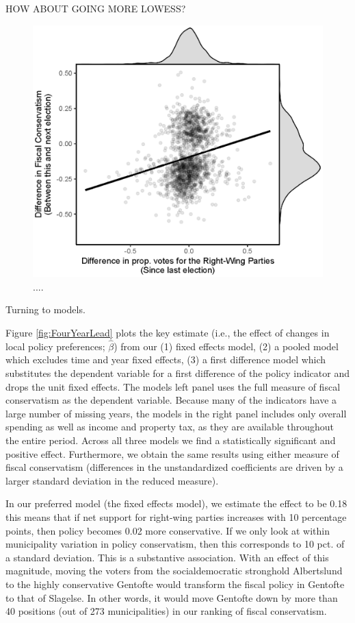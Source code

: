 \documentclass[a4paper,12pt]{article}
\begin{document}
HOW ABOUT GOING MORE LOWESS?

\begin{figure}[h]
	\centering
	\includegraphics[scale = 1.2]{fd_plot.eps}
	\caption{....}
	\label{fig:scatter}
\end{figure}

Turning to models. 

Figure \ref{fig:FourYearLead} plots the key estimate (i.e., the effect of changes in local policy preferences; $\hat{\beta}$) from our (1) fixed effects model, (2) a pooled model which excludes time and year fixed effects, (3) a first difference model which substitutes the dependent variable for a first difference of the policy indicator and drops the unit fixed effects. The models left panel uses the full measure of fiscal conservatism as the dependent variable. Because many of the indicators have a large number of missing years, the models in the right panel includes only overall spending as well as income and property tax, as they are available throughout the entire period. Across all three models we find a statistically significant and positive effect. Furthermore, we obtain the same results using either measure of fiscal conservatism (differences in the unstandardized coefficients are driven by a larger standard deviation in the reduced measure).


In our preferred model (the fixed effects model), we estimate the effect to be 0.18 this means that if net support for right-wing parties increases with 10 percentage points, then policy becomes 0.02 more conservative. If we only look at within municipality variation in policy conservatism, then this corresponds to 10 pct. of a standard deviation.  This is a substantive association. With an effect of this magnitude, moving the voters from the socialdemocratic stronghold Albertslund to the highly conservative Gentofte would transform the fiscal policy in Gentofte to that of Slagelse. In other words, it would move Gentofte down by more than 40 positions (out of 273 municipalities) in our ranking of fiscal conservatism.
\end{document}
